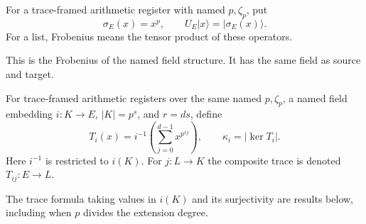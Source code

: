 \begin{definition}
For a trace-framed arithmetic register with named $p,\zeta_p$, put
\[
 \sigma_E(x)=x^p,\qquad U_E|x\rangle=|\sigma_E(x)\rangle.
\]
For a list, Frobenius means the tensor product of these operators.
\end{definition}
\begin{scope}
This is the Frobenius of the named field structure.  It has the same field
as source and target.
\end{scope}

\begin{definition}
For trace-framed arithmetic registers over the same named $p,\zeta_p$,
a named field embedding $i:K\to E$, $|K|=p^s$, and $r=ds$, define
\[
 T_i(x)=i^{-1}\left(\sum_{j=0}^{d-1}x^{p^{sj}}\right),\qquad
 \kappa_i=|\ker T_i|.
\]
Here $i^{-1}$ is restricted to $i(K)$.
For $j:L\to K$ the composite trace is denoted $T_{ij}:E\to L$.
\end{definition}
\begin{scope}
The trace formula taking values in $i(K)$ and its surjectivity are results
below, including when $p$ divides the extension degree.
\end{scope}


